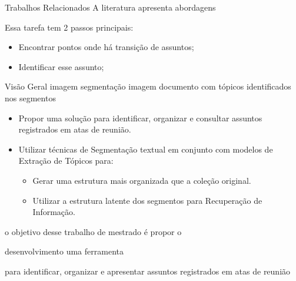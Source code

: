\begin{frame}{Trabalhos Relacionados}
A literatura apresenta abordagens 


Essa tarefa tem 2 passos principais:
\begin{itemize}
	\item Encontrar pontos onde há transição de assuntos;
	\item Identificar esse assunto;
\end{itemize}







Visão Geral 
imagem segmentação 
imagem documento com tópicos identificados nos segmentos








\begin{itemize}
	\item Propor uma solução para identificar, organizar e consultar assuntos registrados em atas de reunião.  
	\item Utilizar técnicas de Segmentação textual em conjunto com modelos de Extração de Tópicos para:
			\begin{itemize}
	\item Gerar uma estrutura mais organizada que a coleção original.
	\item Utilizar a estrutura latente dos segmentos para Recuperação de Informação. 
		\end{itemize}
\end{itemize}










o objetivo desse trabalho de mestrado é propor o 





desenvolvimento uma ferramenta 


para identificar, organizar e apresentar assuntos registrados em atas de reunião 



\end{frame}
